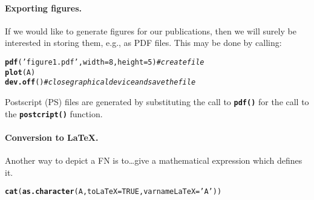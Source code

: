 \documentclass[11pt]{article}\usepackage[]{graphicx}\usepackage[]{color}
\makeatletter
\newcommand{\hlnum}[1]{\textcolor[rgb]{0.686,0.059,0.569}{#1}}%
\newcommand{\hlstr}[1]{\textcolor[rgb]{0.192,0.494,0.8}{#1}}%
\newcommand{\hlcom}[1]{\textcolor[rgb]{0.678,0.584,0.686}{\textit{#1}}}%
\newcommand{\hlstd}[1]{\textcolor[rgb]{0.345,0.345,0.345}{#1}}%
\newcommand{\hlkwc}[1]{\textcolor[rgb]{0.333,0.667,0.333}{#1}}%
\newcommand{\hlkwd}[1]{\textcolor[rgb]{0.737,0.353,0.396}{\textbf{#1}}}%
\newenvironment{kframe}{%
 \def\at@end@of@kframe{}%
 \ifinner\ifhmode%
  \def\at@end@of@kframe{\end{minipage}}%
  \begin{minipage}{\columnwidth}%
 \fi\fi%
 \def\FrameCommand##1{\hskip\@totalleftmargin \hskip-\fboxsep
 \colorbox{shadecolor}{##1}\hskip-\fboxsep
     \hskip-\linewidth \hskip-\@totalleftmargin \hskip\columnwidth}%
 \MakeFramed {\advance\hsize-\width
   \@totalleftmargin\z@ \linewidth\hsize
   \@setminipage}}%
 {\par\unskip\endMakeFramed%
 \at@end@of@kframe}
\newenvironment{knitrout}{}{} %
\newcommand{\func}[1]{\texttt{\hlkwd{#1}}}
\makeatother
\begin{document}
\paragraph{Exporting figures.}
If we would like to generate figures for our publications,
then we will surely be interested in storing them, e.g., as PDF files.
This may be done by calling:

\begin{knitrout}\small
{}\color{fgcolor}\begin{kframe}
\begin{alltt}
\hlkwd{pdf}\hlstd{(}\hlstr{'figure1.pdf'}\hlstd{,} \hlkwc{width}\hlstd{=}\hlnum{8}\hlstd{,} \hlkwc{height}\hlstd{=}\hlnum{5}\hlstd{)} \hlcom{# create file}
\hlkwd{plot}\hlstd{(A)}
\hlkwd{dev.off}\hlstd{()} \hlcom{# close graphical device and save the file}
\end{alltt}
\end{kframe}
\end{knitrout}

\noindent
Postscript (PS) files are generated by substituting the call
to \func{pdf()} for the call to the \func{postcript()} function.


\paragraph{Conversion to \LaTeX.}
Another way to depict a FN is to\dots give a mathematical expression
which defines it.

\begin{knitrout}\small
{}\color{fgcolor}\begin{kframe}
\begin{alltt}
\hlkwd{cat}\hlstd{(}\hlkwd{as.character}\hlstd{(A,} \hlkwc{toLaTeX}\hlstd{=}\hlnum{TRUE}\hlstd{,} \hlkwc{varnameLaTeX}\hlstd{=}\hlstr{'A'}\hlstd{))}
\end{alltt}
\end{kframe}
\end{knitrout}
\end{document}
